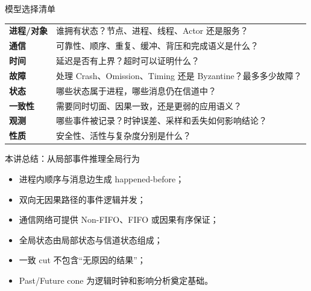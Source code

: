 \documentclass[UTF8,fontset=none,aspectratio=169,10pt]{beamer}
\begin{document}
\begin{frame}{模型选择清单}
\scriptsize
\begin{tabularx}{\linewidth}{>{\bfseries}p{2.3cm}X}
\toprule
进程/对象 & 谁拥有状态？节点、进程、线程、Actor 还是服务？\\
通信 & 可靠性、顺序、重复、缓冲、背压和完成语义是什么？\\
时间 & 延迟是否有上界？超时可以证明什么？\\
故障 & 处理 Crash、Omission、Timing 还是 Byzantine？最多多少故障？\\
状态 & 哪些状态属于进程，哪些消息仍在信道中？\\
一致性 & 需要同时切面、因果一致，还是更弱的应用语义？\\
观测 & 哪些事件被记录？时钟误差、采样和丢失如何影响结论？\\
性质 & 安全性、活性与复杂度分别是什么？\\
\bottomrule
\end{tabularx}
\end{frame}

\begin{frame}{本讲总结：从局部事件推理全局行为}
\begin{center}
\end{center}
\vfill
\begin{itemize}
  \item 进程内顺序与消息边生成 happened-before；
  \item 双向无因果路径的事件逻辑并发；
  \item 通信网络可提供 Non-FIFO、FIFO 或因果有序保证；
  \item 全局状态由局部状态与信道状态组成；
  \item 一致 cut 不包含“无原因的结果”；
  \item Past/Future cone 为逻辑时钟和影响分析奠定基础。
\end{itemize}
\end{frame}
\end{document}
